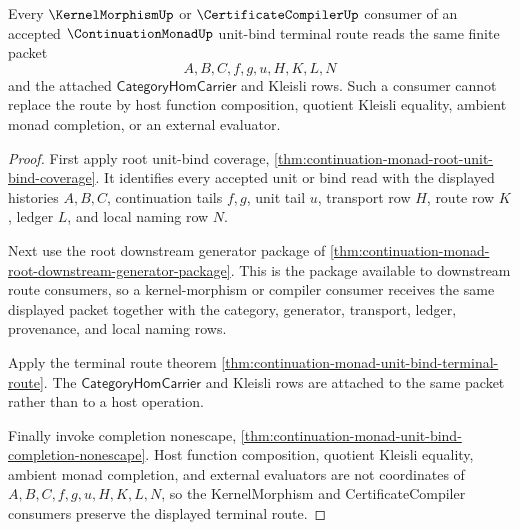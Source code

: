 \begin{theorem}
\label{thm:continuation-monad-unit-bind-kernelmorphism-compiler-coherence}
Every $\KernelMorphismUp$ or $\CertificateCompilerUp$ consumer of an accepted $\ContinuationMonadUp$ unit-bind terminal route reads the same finite packet
$$
A,B,C,f,g,u,H,K,L,N
$$
and the attached $\mathsf{CategoryHomCarrier}$ and Kleisli rows. Such a consumer cannot replace the route by host function composition, quotient Kleisli equality, ambient monad completion, or an external evaluator.
\end{theorem}
\begin{proof}
First apply root unit-bind coverage, \autoref{thm:continuation-monad-root-unit-bind-coverage}. It identifies every accepted unit or bind read with the displayed histories $A,B,C$, continuation tails $f,g$, unit tail $u$, transport row $H$, route row $K$, ledger $L$, and local naming row $N$.

Next use the root downstream generator package of \autoref{thm:continuation-monad-root-downstream-generator-package}. This is the package available to downstream route consumers, so a kernel-morphism or compiler consumer receives the same displayed packet together with the category, generator, transport, ledger, provenance, and local naming rows.

Apply the terminal route theorem \autoref{thm:continuation-monad-unit-bind-terminal-route}. The $\mathsf{CategoryHomCarrier}$ and Kleisli rows are attached to the same packet rather than to a host operation.

Finally invoke completion nonescape, \autoref{thm:continuation-monad-unit-bind-completion-nonescape}. Host function composition, quotient Kleisli equality, ambient monad completion, and external evaluators are not coordinates of $A,B,C,f,g,u,H,K,L,N$, so the KernelMorphism and CertificateCompiler consumers preserve the displayed terminal route.
\end{proof}

